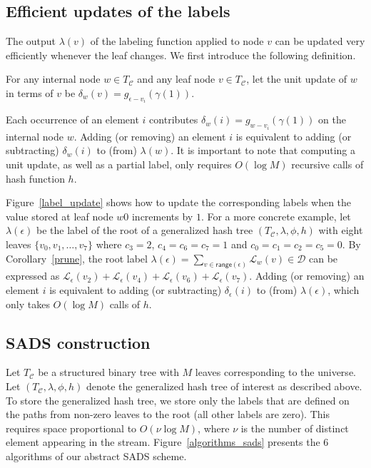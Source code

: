 \subsection{Efficient updates of the labels}
The output $\lambda(v)$ of the labeling function applied to node $v$ can be updated very efficiently whenever the leaf changes. We first introduce the following definition.
\begin{defn}\label{delta}
For any internal node $w \in T_{\mathcal{C}}$ and any leaf node $v \in T_{\mathcal{C}}$, let the unit update of $w$ in terms of $v$ be $\delta_w(v) = g_{\epsilon - v_{i}}(\gamma(1))$.
\end{defn}
Each occurrence of an element $i$ contributes $\delta_w(i)=g_{w - v_{i}}(\gamma(1))$ on the internal node $w$. Adding (or removing) an element $i$ is equivalent to adding (or subtracting) $\delta_w(i)$ to (from) $\lambda(w)$. It is important to note that computing a unit update, as well as a partial label, only requires $O(\log M)$ recursive calls of hash function $h$. 

Figure~\ref{label_update} shows how to update the corresponding labels when the value stored at leaf node $w0$ increments by $1$. For a more concrete example, let $\lambda(\epsilon)$ be the label of the root of a generalized hash tree $(T_{\mathcal{C}},\lambda,\phi,h)$ with eight leaves $\{v_{0},v_{1},\ldots,v_{7}\}$ where $c_3=2$, $c_4=c_6=c_7=1$ and $c_0=c_1=c_2=c_5=0$. By Corollary~\ref{prune}, the root label $\lambda(\epsilon) = \sum_{v\in \mathsf{range}(\epsilon)} \mathcal{L}_w(v)\in {\mathcal{D}}$ can be expressed as $ \mathcal{L}_\epsilon(v_{2})+\mathcal{L}_\epsilon(v_{4})+\mathcal{L}_\epsilon(v_{6})+\mathcal{L}_\epsilon(v_{7})$. Adding (or removing) an element $i$ is equivalent to adding (or subtracting) $\delta_\epsilon(i)$ to (from) $\lambda(\epsilon)$, which only takes $O(\log M)$ calls of $h$.
\subsection{SADS construction}\label{streaming_dictionary}
Let $T_{\mathcal{C}}$ be a structured binary tree with $M$ leaves corresponding to the universe. Let $(T_{\mathcal{C}},\lambda,\phi,h)$ denote the generalized hash tree of interest as described above. To store the generalized hash tree, we store only the labels that are defined on the paths from non-zero leaves to the root (all other labels are zero). This requires space proportional to $O(\nu \log M)$, where $\nu$ is the number of distinct element appearing in the stream. Figure~\ref{algorithms_sads} presents the 6 algorithms of our abstract SADS scheme. 


